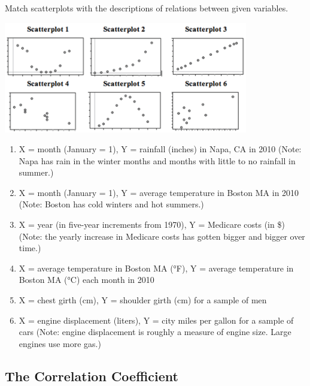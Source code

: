 \begin{exercise}
Match scatterplots with the descriptions of relations between given variables.

\begin{center}
  \includegraphics[width=0.8\textwidth]{Figures/MatchScatterplots.png}
\end{center}

\begin{enumerate}[sepno, label={\textbf{\Alph* :}}]
\item X = month (January = 1), Y = rainfall (inches) in Napa, CA
in 2010 (Note: Napa has rain in the winter months and months with little
to no rainfall in summer.)

\item X = month (January = 1), Y = average temperature in Boston
MA in 2010 (Note: Boston has cold winters and hot summers.)

\item X = year (in five-year increments from 1970),
Y = Medicare costs (in \$) (Note: the yearly increase in Medicare costs
has gotten bigger and bigger over time.)

\item X = average temperature in Boston MA (°F), Y = average
temperature in Boston MA (°C) each month in 2010

\item X = chest girth (cm), Y = shoulder girth (cm) for a sample
of men

\item X = engine displacement (liters), Y = city miles per gallon
for a sample of cars (Note: engine displacement is roughly a measure of
engine size. Large engines use more gas.)
\end{enumerate}

\end{exercise}

\hypertarget{the-correlation-coefficient}{%
\subsection{The Correlation
Coefficient}\label{the-correlation-coefficient}}

